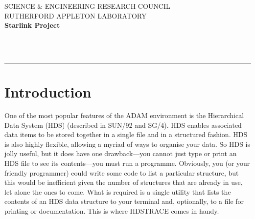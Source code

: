 \newcommand{\sstbugs}[1]{\item[Bugs:] #1}

\newcommand{\sstitemlist}[1]{
  \mbox{} \\
  \vspace{-3.5ex}
  \begin{itemize}
     #1
  \end{itemize}
}

\newcommand{\sstitem}{\item}



\thispagestyle{empty}
SCIENCE \& ENGINEERING RESEARCH COUNCIL \hfill \stardocname\\
RUTHERFORD APPLETON LABORATORY\\
{\large\bf Starlink Project\\}
{\large\bf \stardoccategory\ \stardocnumber}
\begin{flushright}
\stardocauthors\\
\stardocdate
\end{flushright}
\vspace{-4mm}
\rule{\textwidth}{0.5mm}
\vspace{5mm}
\begin{center}
{\Large\bf \stardoctitle}
\end{center}
\vspace{5mm}

\section{Introduction}
One of the most popular features of the ADAM environment is the
Hierarchical Data System (HDS) (described in SUN/92 and SG/4).   HDS
enables associated data items to be stored together in a single file and
in a structured fashion.  HDS is also highly flexible, allowing a myriad
of ways to organise your data.  So HDS is jolly useful, but it does have
one drawback---you cannot just type or print an HDS file to see its
contents---you must run a programme.  Obviously, you (or your friendly
programmer) could write some code to list a particular structure, but
this would be inefficient given the number of structures that are
already in use, let alone the ones to come.  What is required is a
single utility that lists the contents of an HDS data structure to your
terminal and, optionally, to a file for printing or documentation. This
is where {\footnotesize HDSTRACE} comes in handy.


